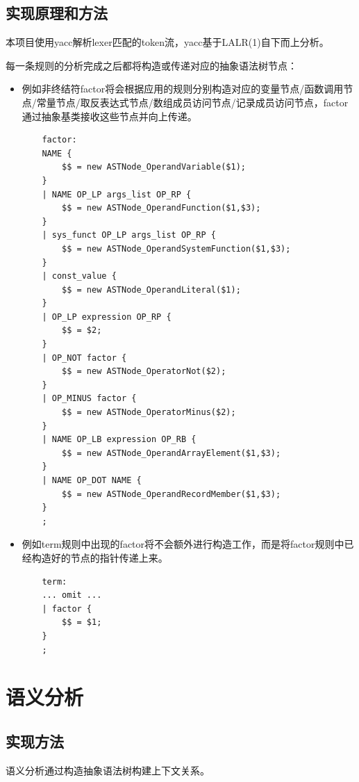 \documentclass{article}
\begin{document}
\subsection{实现原理和方法}
\par 本项目使用yacc解析lexer匹配的token流，yacc基于LALR(1)自下而上分析。
\par 每一条规则的分析完成之后都将构造或传递对应的抽象语法树节点：
\begin{itemize}
  \item 例如非终结符factor将会根据应用的规则分别构造对应的变量节点/函数调用节点/常量节点/取反表达式节点/数组成员访问节点/记录成员访问节点，factor通过抽象基类接收这些节点并向上传递。
  \begin{lstlisting}
    factor:
    NAME {
        $$ = new ASTNode_OperandVariable($1);
    }
    | NAME OP_LP args_list OP_RP {
        $$ = new ASTNode_OperandFunction($1,$3);
    }
    | sys_funct OP_LP args_list OP_RP {
        $$ = new ASTNode_OperandSystemFunction($1,$3);
    }
    | const_value {
        $$ = new ASTNode_OperandLiteral($1);
    }
    | OP_LP expression OP_RP {
        $$ = $2;
    }
    | OP_NOT factor {
        $$ = new ASTNode_OperatorNot($2);
    }
    | OP_MINUS factor {
        $$ = new ASTNode_OperatorMinus($2);
    }
    | NAME OP_LB expression OP_RB {
        $$ = new ASTNode_OperandArrayElement($1,$3);
    }
    | NAME OP_DOT NAME {
        $$ = new ASTNode_OperandRecordMember($1,$3);
    }
    ;
  \end{lstlisting}
  \item 例如term规则中出现的factor将不会额外进行构造工作，而是将factor规则中已经构造好的节点的指针传递上来。
  \begin{lstlisting}
    term:
    ... omit ...
    | factor {
        $$ = $1;
    }
    ;
  \end{lstlisting}
\end{itemize}

\newpage
\section{语义分析}
\subsection{实现方法}
语义分析通过构造抽象语法树构建上下文关系。
\end{document}
